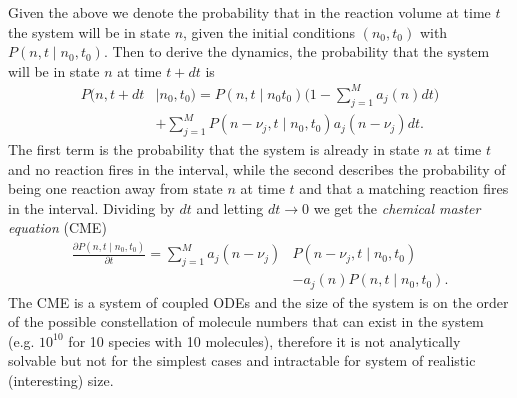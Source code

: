 \documentclass[a4paper]{article}
\newcommand{\given}{\mid}
\theoremstyle{plain}
\theoremstyle{definition}
\theoremstyle{remark}
\begin{document}
Given the above we denote the probability that in the reaction volume at
time $t$ the system will be in state $n$, given the initial conditions $(n_0,
t_0)$ with $P(n, t \given n_0, t_0)$. Then to derive the dynamics, the
probability that the system will be in state $n$ at time $t + dt$ is
\begin{align*}
  P(n, t+dt &\given n_0, t_0) =
    P(n, t \given n_0 t_0) \Biggl(
      1 - \sum_{j=1}^M a_j(n) dt
    \Biggr) \\
    &+ \sum_{j=1}^M P(n - \nu_j, t \given n_0, t_0) a_j (n - \nu_j) dt.
\end{align*}
The first term is the probability that the system is already in state $n$ at
time $t$ and no reaction fires in the interval, while the second describes the
probability of being one reaction away from state $n$ at time $t$ and that a
matching reaction fires in the interval. Dividing by $dt$ and letting $dt \to
0$ we get the \emph{chemical master equation} (CME)
\begin{align*}
  \frac{\partial P (n, t \given n_0, t_0)}{\partial t}
  = \sum_{j=1}^M a_j(n - \nu_j) &P(n - \nu_j, t \given n_0, t_0) \\
    &- a_j(n) P(n, t \given n_0, t_0).
\end{align*}
The CME is a system of coupled ODEs and the size of the system is on the order
of the possible constellation of molecule numbers that can exist in the system
(e.g. $10^{10}$ for 10 species with 10 molecules), therefore it is not
analytically solvable but not for the simplest cases and intractable for
system of realistic (interesting) size.
\end{document}
